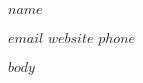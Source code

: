 \documentclass[$if(fontsize)$$fontsize$$else$10pt$endif$,letterpaper]{article}
\begin{document}
\centerline{\Large\bfseries $name$}

\vspace{0.5em}

\centerline{\href{mailto: $email$}{$email$} {\large\textperiodcentered} \href{$website$}{$website$} {\large\textperiodcentered} \href{tel:$phone$}{$phone$} \ {\Large}}


$body$

\end{document}
